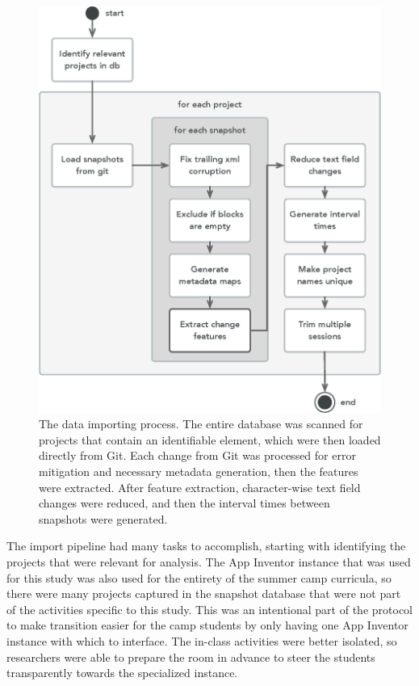 \begin{figure}
  \centering
      \includegraphics[width=\textwidth]{diagrams/data-import-process}
  \caption[The Data Importing Process]{The data importing process. The entire database was scanned for projects that contain an identifiable element, which were then loaded directly from Git. Each change from Git was processed for error mitigation and necessary metadata generation, then the features were extracted. After feature extraction, character-wise text field changes were reduced, and then the interval times between snapshots were generated.}
  \label{fig:data-import-process}
\end{figure}

The import pipeline had many tasks to accomplish, starting with identifying the projects that were relevant for analysis. The App Inventor instance that was used for this study was also used for the entirety of the summer camp curricula, so there were many projects captured in the snapshot database that were not part of the activities specific to this study. This was an intentional part of the protocol to make transition easier for the camp students by only having one App Inventor instance with which to interface. The in-class activities were better isolated, so researchers were able to prepare the room in advance to steer the students transparently towards the specialized instance. 


